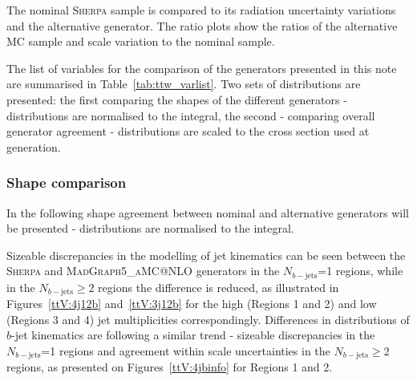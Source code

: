 The nominal  \textsc{Sherpa} \ttW  sample is compared to its radiation uncertainty variations and the alternative generator.
The ratio plots show the ratios of the alternative MC sample and scale variation to the nominal sample.

The list of variables for the comparison of the \ttW generators presented in this note are summarised in Table~\ref{tab:ttw_varlist}.
Two sets of distributions are presented: the first comparing the shapes of the different generators - distributions are normalised to the integral, the second - comparing overall generator agreement - distributions are scaled to the cross section used at generation. %

\subsubsection{Shape comparison}
\label{sec:ttw_shape}
In the following shape agreement between nominal and alternative generators will be presented - distributions are normalised to the integral.

Sizeable discrepancies in the modelling of jet kinematics can be seen between the \textsc{Sherpa} \ttW and \textsc{MadGraph5\_aMC@NLO} generators in the $N_{b-\mathrm{jets}}$=1 regions, while in the $N_{b-\mathrm{jets}}\geq$2 regions the difference is reduced, as illustrated in Figures~\ref{ttV:4j12b} and~\ref{ttV:3j12b} for the high (Regions 1 and 2) and low (Regions 3 and 4) jet multiplicities correspondingly. 
Differences in distributions of $b$-jet kinematics are following a similar trend - sizeable discrepancies in the $N_{b-\mathrm{jets}}$=1 regions and agreement within scale uncertainties in the $N_{b-\mathrm{jets}}\geq$2 regions, as presented on Figures~\ref{ttV:4jbinfo} for Regions 1 and 2.


